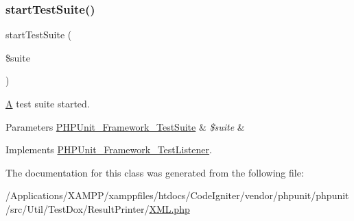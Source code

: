 \subsubsection{\texorpdfstring{start\+Test\+Suite()}{startTestSuite()}}
{\footnotesize\ttfamily start\+Test\+Suite (\begin{DoxyParamCaption}\item[{\mbox{\hyperlink{class_p_h_p_unit___framework___test_suite}{P\+H\+P\+Unit\+\_\+\+Framework\+\_\+\+Test\+Suite}}}]{\$suite }\end{DoxyParamCaption})}

\mbox{\hyperlink{class_a}{A}} test suite started.


\begin{DoxyParams}[1]{Parameters}
\mbox{\hyperlink{class_p_h_p_unit___framework___test_suite}{P\+H\+P\+Unit\+\_\+\+Framework\+\_\+\+Test\+Suite}} & {\em \$suite} & \\
\hline
\end{DoxyParams}


Implements \mbox{\hyperlink{interface_p_h_p_unit___framework___test_listener_a901a86a623d83184267b21f2daee0ff5}{P\+H\+P\+Unit\+\_\+\+Framework\+\_\+\+Test\+Listener}}.



The documentation for this class was generated from the following file\+:\begin{DoxyCompactItemize}
\item 
/\+Applications/\+X\+A\+M\+P\+P/xamppfiles/htdocs/\+Code\+Igniter/vendor/phpunit/phpunit/src/\+Util/\+Test\+Dox/\+Result\+Printer/\mbox{\hyperlink{_test_dox_2_result_printer_2_x_m_l_8php}{X\+M\+L.\+php}}\end{DoxyCompactItemize}
